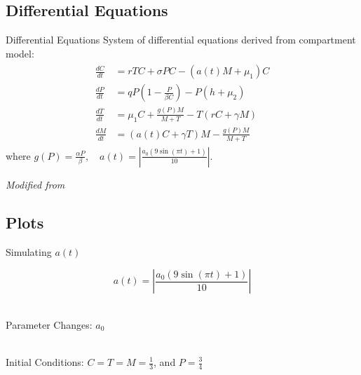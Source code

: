 \documentclass{beamer}
\begin{document}
\subsection{Differential Equations}
\begin{frame}{Differential Equations}
    System of differential equations derived from compartment model:
    \begin{align*}
        \begin{split}
            \frac{dC}{dt} &= rTC + \sigma PC- (a(t)M+\mu_{1})C\\
            \frac{dP}{dt} &= qP \left( 1-\frac{P}{\beta C} \right) - P \left( h+\mu_{2} \right)\\
            \frac{dT}{dt} &= \mu_{1}C + \frac{g(P)M}{M+T} - T(rC+\gamma M)\\
            \frac{dM}{dt} &= (a(t)C+ \gamma T)M - \frac{g(P)M}{M+T}
            \label{SoODE}
        \end{split}
    \end{align*}
    where $g(P) = \frac{\alpha P}{\beta}, \quad a(t)=|\frac{a_{0}(9\sin{(\pi t) }+1)}{10}|$.\\ 
    \quad
    \begin{center}
        \textit{Modified from \cite{13_blackwood_hastings_mumby_2010}}
    \end{center}
\end{frame}

\subsection{Plots}
\begin{frame}{Simulating $a(t)$}
    \begin{center}
        $$a(t)= \left|\frac{a_{0}(9\sin{(\pi t) }+1)}{10} \right|$$\\
    \end{center}
    
\end{frame}

\begin{frame}{Parameter Changes: $a_{0}$}
    \begin{center}
        \\
        Initial Conditions: $C = T = M = \frac{1}{3}$, and $P = \frac{3}{4}$
    \end{center}
\end{frame}
\end{document}
